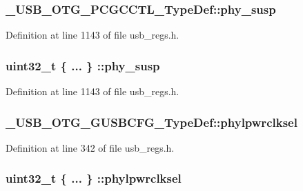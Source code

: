 \hypertarget{group___u_s_b___o_t_g___d_r_i_v_e_r_ga535f75e5436b75614c13d56c654a2b49}{
\subsubsection[{phy\-\_\-susp}]{ \-\_\-\-U\-S\-B\-\_\-\-O\-T\-G\-\_\-\-P\-C\-G\-C\-C\-T\-L\-\_\-\-Type\-Def\-::phy\-\_\-susp}}\label{group___u_s_b___o_t_g___d_r_i_v_e_r_ga535f75e5436b75614c13d56c654a2b49}


Definition at line 1143 of file usb\-\_\-regs.\-h.

\hypertarget{group___u_s_b___o_t_g___d_r_i_v_e_r_gae85076bfdfadfe9f7b4b31100e56d79f}{
\subsubsection[{phy\-\_\-susp}]{\setlength{\rightskip}{0pt plus 5cm}uint32\-\_\-t \{ ... \} \-::phy\-\_\-susp}}\label{group___u_s_b___o_t_g___d_r_i_v_e_r_gae85076bfdfadfe9f7b4b31100e56d79f}


Definition at line 1143 of file usb\-\_\-regs.\-h.

\hypertarget{group___u_s_b___o_t_g___d_r_i_v_e_r_ga5b4ca996d79eeaf720a45ea5556ffb56}{
\subsubsection[{phylpwrclksel}]{ \-\_\-\-U\-S\-B\-\_\-\-O\-T\-G\-\_\-\-G\-U\-S\-B\-C\-F\-G\-\_\-\-Type\-Def\-::phylpwrclksel}}\label{group___u_s_b___o_t_g___d_r_i_v_e_r_ga5b4ca996d79eeaf720a45ea5556ffb56}


Definition at line 342 of file usb\-\_\-regs.\-h.

\hypertarget{group___u_s_b___o_t_g___d_r_i_v_e_r_gaa08f093c47c6c35431d664835140fda7}{
\subsubsection[{phylpwrclksel}]{\setlength{\rightskip}{0pt plus 5cm}uint32\-\_\-t \{ ... \} \-::phylpwrclksel}}\label{group___u_s_b___o_t_g___d_r_i_v_e_r_gaa08f093c47c6c35431d664835140fda7}


